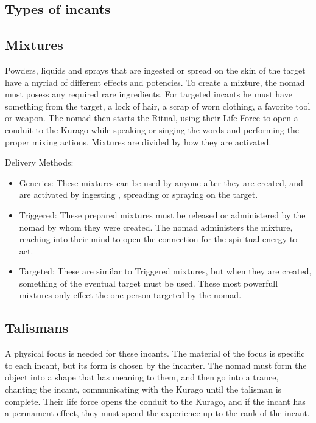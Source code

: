 \begin{multicols*}{2}
\section{Types of incants}

\subsection{Mixtures}

Powders, liquids and sprays that are ingested or spread on the skin of the target have a myriad of different effects and potencies.  To create a mixture, the nomad must posess any required rare ingredients. For targeted incants he must have something from the target, a lock of hair, a scrap of worn clothing, a favorite tool or weapon. The nomad then starts the Ritual, using their Life Force to open a conduit to the Kurago while speaking or singing the words and performing the proper mixing actions. Mixtures are divided by how they are activated.

Delivery Methods:
\begin{itemize}
\item Generics: These mixtures can be used by anyone after they are created, and are activated by ingesting , spreading or spraying on the target.

\item Triggered: These prepared mixtures must be released or administered by the nomad by whom they were created. The nomad administers the mixture, reaching into their mind to open the connection for the spiritual energy to act.

\item Targeted: These are similar to Triggered mixtures, but when they are created, something of the eventual target must be used. These most powerfull mixtures only effect the one person targeted by the nomad.
\end{itemize}

\subsection{Talismans}

A physical focus is needed for these incants. The material of the focus is specific to each incant, but its form is chosen by the incanter. The nomad must form the object into a shape that has meaning to them, and then go into a trance, chanting the incant, communicating with the Kurago until the talisman is complete. Their life force opens the conduit to the Kurago, and if the incant has a permament effect, they must spend the experience up to the rank of the incant.


\end{multicols*}
